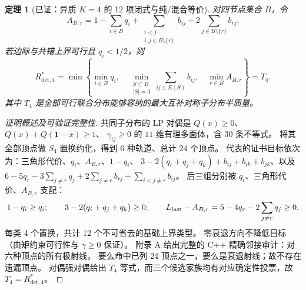 \documentclass[11pt,a4paper]{ctexart}
\newtheorem{theorem}{定理}[section]
\theoremstyle{remark}\newtheorem{remark}[theorem]{备注}
\newcommand{\Rfour}{R^*_{\mathrm{det},4}}
\newcommand{\bx}{\mathbf{1}}
\begin{document}
\begin{theorem}[已证：异质 $K=4$ 的 12 项闭式与纯/混合等价]
对四节点集合 $B$，令
\[
A_{B,r}=1-\sum_{i\in B}q_i
+\sum_{\substack{i<j\\i,j\in B\setminus\{r\}}}b_{ij}
+2\sum_{j\in B\setminus\{r\}}b_{rj}.
\]
若边际与共错上界可行且 $q_i<1/2$，则
\[
\boxed{\displaystyle
\Rfour=\min\left\{
\min_{i\in B}q_i,\quad
\min_{\substack{S\subset B\\|S|=3}}\sum_{ij\in E(S)}b_{ij},\quad
\min_{r\in B}A_{B,r}\right\}=T_4.}
\]
其中 $T_4$ 是全部可行联合分布能够容纳的最大\emph{互补对称子分布半质量}。
\end{theorem}
\begin{proof}[证明概述及可验证完整性]
共同子分布的 LP 对偶是 $Q(x)\ge0$、$Q(x)+Q(\bx-x)\ge1$、
$\gamma_{ij}\ge0$ 的 $11$ 维有理多面体，含 $30$ 条不等式。
将其全部顶点做 $S_4$ 置换约化，得到 6 种轨道、总计 24 个顶点。
代表的证书目标依次为：三角形代价、$q_i$、$A_{B,r}$、$1-q_i$、
$3-2(q_i+q_j+q_k)+b_{ij}+b_{ik}+b_{jk}$、以及
$6-5q_r-3\sum_{j\ne r}q_j+2\sum_{j\ne r}b_{rj}+
\sum_{i<j\ne r}b_{ij}$。
后三组分别被 $q_i$、三角形代价、$A_{B,r}$ 支配：
\[
1-q_i\ge q_i;\qquad
3-2(q_i+q_j+q_k)\ge0;\qquad
L_{\rm last}-A_{B,r}=5-4q_r-2\sum_{j\ne r}q_j\ge0.
\]
每类 4 个置换，共计 12 个不可省去的基础上界类型。
零衰退方向不降低目标（由矩约束可行性与 $\gamma\ge0$ 保证）。
附录 A 给出完整的 C++ 精确邻接审计：对六种顶点的所有极射线，
要么命中已列 24 顶点之一，要么是衰退射线；故不存在遗漏顶点。
对偶强对偶给出 $T_4$ 等式，而三个候选家族均有对应确定性投票，故 $T_4=\Rfour$。
\end{proof}
\end{document}
